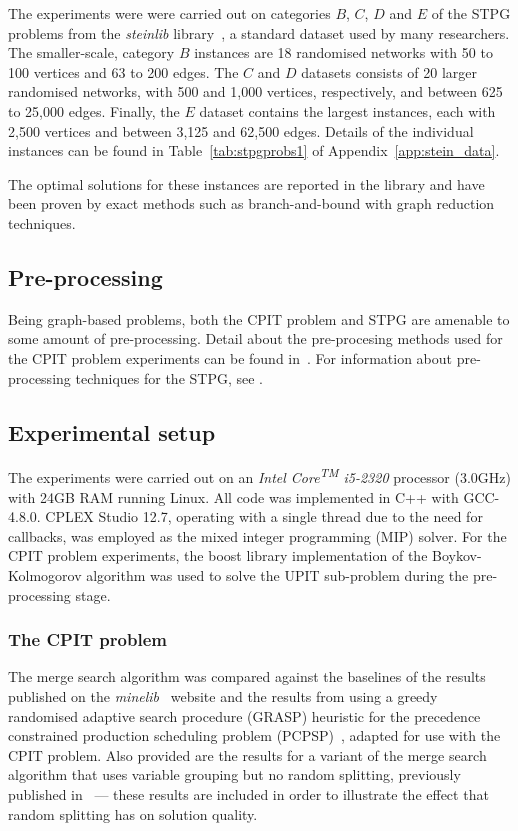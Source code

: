 \documentclass[journal]{IEEEtran}
\begin{document}
The experiments were were carried out on categories $B$, $C$, $D$ and $E$ of the STPG problems from the \textit{steinlib} library~\cite{steinlib}, a standard dataset used by many researchers. The smaller-scale, category $B$ instances are 18 randomised networks with 50 to 100 vertices and 63 to 200 edges. The $C$ and $D$ datasets consists of 20 larger randomised networks, with 500 and 1,000 vertices, respectively, and between 625 to 25,000 edges. Finally, the $E$ dataset contains the largest instances, each with 2,500 vertices and between 3,125 and 62,500 edges. Details of the individual instances can be found in Table~\ref{tab:stpgprobs1} of Appendix~\ref{app:stein_data}. 

The optimal solutions for these instances are reported in the library and 
have been proven by exact methods such as branch-and-bound with graph reduction techniques.\par



\subsection{Pre-processing}
Being graph-based problems, both the CPIT problem and STPG are amenable to some amount of pre-processing. Detail about the pre-procesing methods used for the CPIT problem experiments can be found in~\cite{gecco17}. For information about pre-processing techniques for the STPG, see \cite{pp:duin,pp:uchoa,stpg-reduce}.

\subsection{Experimental setup}
The experiments were carried out on an \emph{Intel{\textsuperscript{\textregistered}} Core{\textsuperscript{TM}} i5-2320} processor (3.0GHz) with 24GB RAM running Linux. All code was implemented in C++ with GCC-4.8.0. CPLEX Studio 12.7, operating with a single thread due to the need for callbacks, was employed as the mixed integer programming (MIP) solver. For the CPIT problem experiments, the boost library implementation of the Boykov-Kolmogorov algorithm was used to solve the UPIT sub-problem during the pre-processing stage.

\subsubsection*{The CPIT problem}
The merge search algorithm was compared against the baselines of the results published on the \emph{minelib}~\cite{minelib} website and the results from using a greedy randomised adaptive search procedure (GRASP) heuristic for the precedence constrained production scheduling problem (PCPSP)~\cite{gecco17}, adapted for use with the CPIT problem. Also provided are the results for a variant of the merge search algorithm that uses variable grouping but no random splitting, previously published in~\cite{gecco18} --- these results are included in order to illustrate the effect that random splitting has on solution quality.
\end{document}
